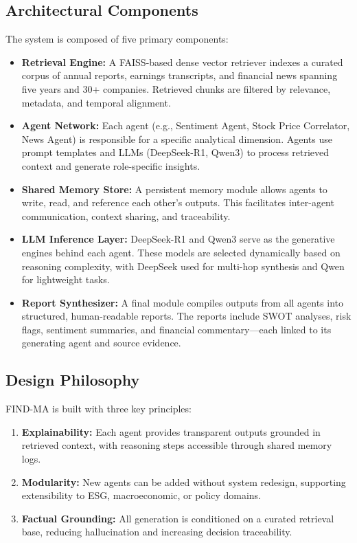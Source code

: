 \documentclass[11pt]{article}
\newcommand{\findma}{\textsc{FIND-MA}}
\begin{document}
\subsection*{Architectural Components}
The system is composed of five primary components:
\begin{itemize}
    \item \textbf{Retrieval Engine:} A FAISS-based dense vector retriever indexes a curated corpus of annual reports, earnings transcripts, and financial news spanning five years and 30+ companies. Retrieved chunks are filtered by relevance, metadata, and temporal alignment.
    \item \textbf{Agent Network:} Each agent (e.g., Sentiment Agent, Stock Price Correlator, News Agent) is responsible for a specific analytical dimension. Agents use prompt templates and LLMs (DeepSeek-R1, Qwen3) to process retrieved context and generate role-specific insights.
    \item \textbf{Shared Memory Store:} A persistent memory module allows agents to write, read, and reference each other’s outputs. This facilitates inter-agent communication, context sharing, and traceability.
    \item \textbf{LLM Inference Layer:} DeepSeek-R1 and Qwen3 serve as the generative engines behind each agent. These models are selected dynamically based on reasoning complexity, with DeepSeek used for multi-hop synthesis and Qwen for lightweight tasks.
    \item \textbf{Report Synthesizer:} A final module compiles outputs from all agents into structured, human-readable reports. The reports include SWOT analyses, risk flags, sentiment summaries, and financial commentary—each linked to its generating agent and source evidence.
\end{itemize}

\subsection*{Design Philosophy}
\findma{} is built with three key principles:
\begin{enumerate}
    \item \textbf{Explainability:} Each agent provides transparent outputs grounded in retrieved context, with reasoning steps accessible through shared memory logs.
    \item \textbf{Modularity:} New agents can be added without system redesign, supporting extensibility to ESG, macroeconomic, or policy domains.
    \item \textbf{Factual Grounding:} All generation is conditioned on a curated retrieval base, reducing hallucination and increasing decision traceability.
\end{enumerate}
\end{document}
